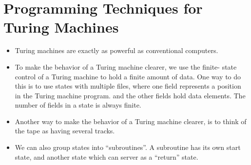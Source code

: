 \documentclass[]{article}
\begin{document}
\section{Programming Techniques for Turing Machines}
  \begin{itemize}
    \item Turing machines are exactly as powerful as conventional computers.
    \item To make the behavior of a Turing machine clearer, we use the finite-
    state control of a Turing machine to hold a finite amount of data. One way to 
    do this is to use states with multiple files, where one field represents a 
    position in the Turing machine program. and the other fields hold data 
    elements. The number of fields in a state is always finite.
    \item Another way to make the behavior of a Turing machine clearer, is to 
    think of the tape as having several tracks.
    \item We can also group states into ``subroutines''. A subroutine has its own 
    start state, and another state which can server as a ``return'' state.
  \end{itemize}
  
\end{document}
